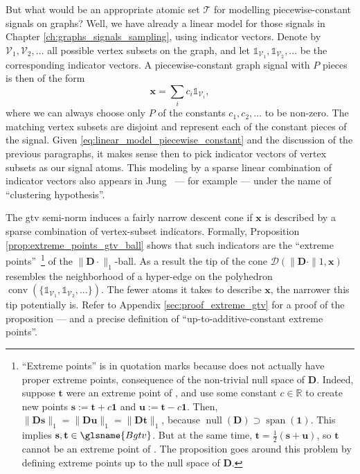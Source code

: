 But what would be an appropriate atomic set $\mathcal{T}$ for modelling piecewise-constant signals on graphs? Well, we have already a linear model for those signals in Chapter \ref{ch:graphs_signals_sampling}, using indicator vectors. Denote by $\mathcal{V}_1, \mathcal{V}_2, \dots$ all possible vertex subsets on the graph, and let $\mathbb{1}_{\mathcal{V}_1}, \mathbb{1}_{\mathcal{V}_2}, \dots$ be the corresponding indicator vectors. A piecewise-constant graph signal with $P$ pieces is then of the form
\begin{equation}\label{eq:linear_model_piecewise_constant}
    \mathbf{x} = \sum_{i} c_i \mathbb{1}_{\mathcal{V}_i},
\end{equation}
where we can always choose only $P$ of the constants $c_1, c_2, \dots$ to be non-zero. The matching vertex subsets are disjoint and represent each of the constant pieces of the signal. Given \eqref{eq:linear_model_piecewise_constant} and the discussion of the previous paragraphs, it makes sense then to pick indicator vectors of vertex subsets as our signal atoms. This modeling by a sparse linear combination of indicator vectors also appears in Jung~\cite{jung2018} --- for example --- under the name of ``clustering hypothesis''.

The \acrshort{gtv} semi-norm induces a fairly narrow descent cone if $\mathbf{x}$ is described by a sparse combination of vertex-subset indicators. Formally, Proposition \ref{prop:extreme_points_gtv_ball} shows that such indicators are the ``extreme points''~\footnote{``Extreme points'' is in quotation marks because  does not actually have proper extreme points, consequence of the non-trivial null space of $\mathbf{D}$. Indeed, suppose $\mathbf{t}$ were an extreme point of , and use some constant $c \in \mathbb{R}$ to create new points $\mathbf{s} := \mathbf{t} + c\mathbf{1}$ and $\mathbf{u} := \mathbf{t} - c\mathbf{1}$. Then, $\|\mathbf{Ds}\|_1 = \|\mathbf{Du}\|_1 = \|\mathbf{Dt}\|_1$, because $\operatorname{null} \left ( \mathbf{D} \right) \supset \operatorname{span} \left ( \mathbf{1} \right )$. This implies $\mathbf{s,t} \in \glsname{Bgtv}$. But at the same time, $\mathbf{t} = \frac{1}{2} (\mathbf{s} + \mathbf{u})$, so $\mathbf{t}$ cannot be an extreme point of . The proposition goes around this problem by defining extreme points up to the null space of $\mathbf{D}$.} of the $\| \mathbf{D} \cdot \|_1$-ball. As a result the tip of the cone $\mathcal{D}(\|\mathbf{D} \cdot \|1, \mathbf{x})$ resembles the neighborhood of a hyper-edge on the polyhedron $\operatorname{conv}(\{\mathbb{1}_{\mathcal{V}_1}, \mathbb{1}_{\mathcal{V}_2}, \dots\})$. The fewer atoms it takes to describe $\mathbf{x}$, the narrower this tip potentially is. Refer to Appendix \ref{sec:proof_extreme_gtv} for a proof of the proposition --- and a precise definition of ``up-to-additive-constant extreme points''.

